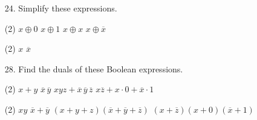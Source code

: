 \begin{itemize}
    \item[24.]  Simplify these expressions.
          \begin{tasks}(2)
              \task $x \oplus 0$
              \task $x \oplus 1$
              \task $x \oplus x$
              \task $x \oplus \overline{x}$
          \end{tasks}
          \answer
          \begin{tasks}(2)
              \task $x$
              \task $\overline{x}$
          \end{tasks}

    \item[28.]  Find the duals of these Boolean expressions.
          \begin{tasks}(2)
              \task $x + y$
              \task $\overline{x}\, \overline{y}$
              \task $xyz + \overline{x}\, \overline{y}\, \overline{z}$
              \task $x\overline{z} + x \cdot 0 + \overline{x} \cdot 1$
          \end{tasks}
          \answer
          \begin{tasks}(2)
              \task $xy$
              \task $\overline{x} + \overline{y}$
              \task $(x + y + z)(\overline{x} + \overline{y} + \overline{z})$
              \task $(x+\overline{z})(x+0)(\overline{x}+1)$
          \end{tasks}



\end{itemize}

